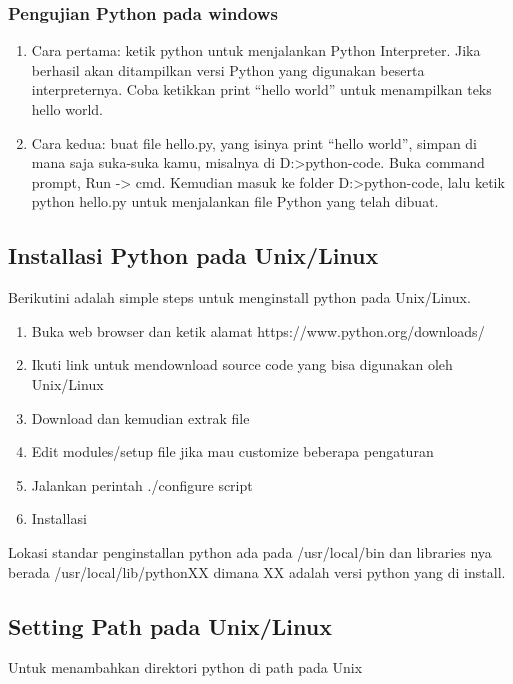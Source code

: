 \subsubsection{Pengujian Python pada windows}
	\begin{enumerate}
	\item Cara pertama: ketik python untuk menjalankan Python Interpreter. 
	      Jika berhasil akan ditampilkan versi Python yang digunakan beserta interpreternya. 
	      Coba ketikkan print “hello world” untuk menampilkan teks hello world.
	\item Cara kedua: buat file hello.py, yang isinya print “hello world”, 
	      simpan di mana saja suka-suka kamu, misalnya di D:>python-code. Buka command prompt, Run -> cmd. 
	      Kemudian masuk ke folder D:>python-code, lalu ketik python hello.py untuk menjalankan file Python yang telah dibuat.
	\end{enumerate}

\subsection{Installasi Python pada Unix/Linux}
	Berikutini adalah simple steps untuk menginstall python pada Unix/Linux.
	\begin{enumerate}
	\item Buka web browser dan ketik alamat https://www.python.org/downloads/
	\item Ikuti link untuk mendownload source code yang bisa digunakan oleh Unix/Linux
	\item Download dan kemudian extrak file
	\item Edit modules/setup file jika mau customize beberapa pengaturan
	\item Jalankan perintah ./configure script
	\item Installasi 
	\end{enumerate}
Lokasi standar penginstallan python ada pada /usr/local/bin dan libraries nya berada 
/usr/local/lib/pythonXX dimana XX adalah versi python yang di install.

\subsection{Setting Path pada Unix/Linux}
Untuk menambahkan direktori python di path pada Unix

